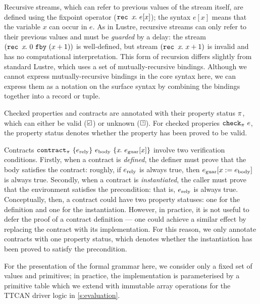 Recursive streams, which can refer to previous values of the stream itself, are defined using the fixpoint operator ($\texttt{rec~} x\hspace{-0.1em}.~e[x]$); the syntax $e[x]$ means that the variable $x$ can occur in $e$.
As in Lustre, recursive streams can only refer to their previous values and must be \emph{guarded} by a delay: the stream $(\texttt{rec~} x\hspace{-0.1em}.~0~\texttt{fby}~(x + 1))$ is well-defined, but stream $(\texttt{rec~} x\hspace{-0.1em}.~x + 1)$ is invalid and has no computational interpretation.
This form of recursion differs slightly from standard Lustre, which uses a set of mutually-recursive bindings.
Although we cannot express mutually-recursive bindings in the core syntax here, we can express them as a notation on the surface syntax by combining the bindings together into a record or tuple.

Checked properties and contracts are annotated with their property status $\pi$, which can either be valid ($\PSValid$) or unknown ($\PSUnknown$).
For checked properies $\texttt{check}_{\pi}~e$, the property status denotes whether the property has been proved to be valid.

Contracts $\texttt{contract}_{\pi}~\{e_{\text{rely}}\}~e_{\text{body}}~\{x\hspace{-0.1em}.~e_{\text{guar}}[x]\}$ involve two verification conditions.
Firstly, when a contract is \emph{defined}, the definer must prove that the body satisfies the contract: roughly, if $e_{\text{rely}}$ is always true, then $e_{\text{guar}}[x := e_{\text{body}}]$ is always true.
Secondly, when a contract is \emph{instantiated}, the caller must prove that the environment satisfies the precondition: that is, $e_{\text{rely}}$ is always true.
Conceptually, then, a contract could have two property statuses: one for the definition and one for the instantiation.
However, in practice, it is not useful to defer the proof of a contract definition --- one could achieve a similar effect by replacing the contract with its implementation.
For this reason, we only annotate contracts with one property status, which denotes whether the instantiation has been proved to satisfy the precondition.

For the presentation of the formal grammar here, we consider only a fixed set of values and primitives; in practice, the implementation is parameterised by a primitive table which we extend with immutable array operations for the TTCAN driver logic in \autoref{s:evaluation}.


